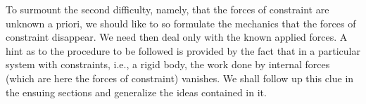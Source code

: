 To surmount the second difficulty, namely, that the forces of constraint are unknown a priori, we should like to so formulate the mechanics that the forces of constraint disappear. We need then deal only with the known applied forces. A hint as to the procedure to be followed is provided by the fact that in a particular system with constraints, i.e., a rigid body, the work done by internal forces (which are here the forces of constraint) vanishes. We shall follow up this clue in the ensuing sections and generalize the ideas contained in it.
